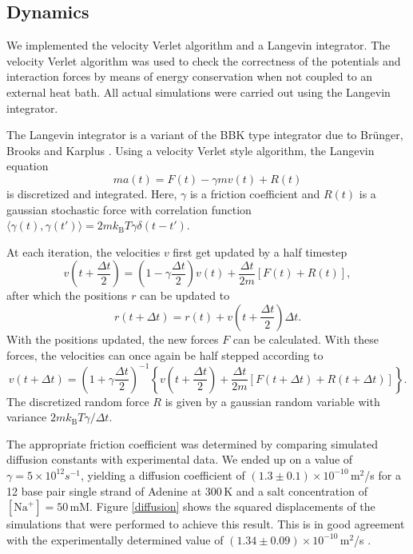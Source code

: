 \subsection{Dynamics}
We implemented the velocity Verlet algorithm and a Langevin integrator. The velocity Verlet algorithm was used to check the correctness of the potentials and interaction forces by means of energy conservation when not coupled to an external heat bath. All actual simulations were carried out using the Langevin integrator.

The Langevin integrator is a variant of the BBK type integrator due to Br{\"u}nger, Brooks and Karplus \cite{brunger1984stochastic}. Using a velocity Verlet style algorithm, the Langevin equation
\begin{equation}
m a(t) = F(t) - \gamma m v(t) + R(t)
\end{equation}
is discretized and integrated. Here, $\gamma$ is a friction coefficient and $R(t)$ is a gaussian stochastic force with correlation function $\langle\gamma(t), \gamma(t')\rangle = 2 m k_\text{B} T \gamma \delta(t-t')$.

At each iteration, the velocities $v$ first get updated by a half timestep
\begin{equation}
v\left(t + \frac{\Delta t}{2}\right)
= \left(1 - \gamma\frac{\Delta t}{2}\right) v(t)
	+ \frac{\Delta t}{2m} [F(t) + R(t)],
\end{equation}
after which the positions $r$ can be updated to
\begin{equation}
r(t + \Delta t)
= r(t) + v\left(t + \frac{\Delta t}{2}\right) \Delta t.
\end{equation}
With the positions updated, the new forces $F$ can be calculated. With these forces, the velocities can once again be half stepped according to
\begin{equation}
v(t + \Delta t) = \left(1 + \gamma \frac{\Delta t}{2}\right)^{-1}
\left\{
	v\left(t + \frac{\Delta t}{2}\right)
	+ \frac{\Delta t}{2m} \left[
			F(t + \Delta t) + R(t + \Delta t)
	\right]
\right\}.
\end{equation}
The discretized random force $R$ is given by a gaussian random variable with variance $2 m k_\text{B} T \gamma / \Delta t$.

The appropriate friction coefficient was determined by comparing simulated diffusion constants with experimental data. We ended up on a value of $\gamma = 5 \times 10^{12} s^{-1}$, yielding a diffusion coefficient of $(1.3 \pm 0.1) \times 10^{-10}$\,m$^2$/s for a 12 base pair single strand of Adenine at 300\,K and a salt concentration of $[\text{Na}^+] = 50$\,mM.
Figure \ref{diffusion} shows the squared displacements of the simulations that were performed to achieve this result. This is in good agreement with the experimentally determined value of $(1.34 \pm 0.09) \times 10^{-10}$\,m$^2$/s \cite{stellwagen2001measuring, bonifacio1997comparison, eimer1991rotational}. 



